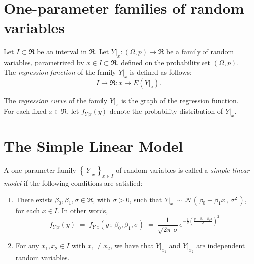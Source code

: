 \documentclass{article}
\begin{document}


\pagestyle{fancy}

%

\lfoot[]{}
\cfoot[]{}
\rfoot[]{\thepage}


\section{One-parameter families of random variables}
\setcounter{theorem}{0}

Let $I \subset \Re$ be an interval in $\Re$.
Let $Y|_{x} : (\Omega,p) \longrightarrow \Re$ be a family of random variables, parametrized by $x\in I \subset \Re$, defined on the probability set $(\Omega,p)$.  \\

\noindent
The \emph{regression function} of the family $Y|_{x}$ is defined as follows:
\begin{equation*}
    I \longrightarrow \Re : x \longmapsto E(Y|_{x}).
\end{equation*}

\noindent
The \emph{regression curve} of the family $Y|_{x}$ is the graph of the regression function. \\

\noindent
For each fixed $x\in\Re$, let $f_{Y|x}(y)$ denote the probability distribution of $Y|_{x}$.


\section{The Simple Linear Model}
\setcounter{theorem}{0}

A one-parameter family $\left\{\,Y|_{x}\,\right\}_{x\in I}$ of random variables is called a \emph{simple linear model} if the following conditions are satisfied:
\begin{enumerate}
\item  There exists $\beta_{0},\beta_{1},\sigma\in\Re$, with $\sigma > 0$, such that
          $Y|_{x} \, \sim \, \mathcal{N}(\,\beta_{0}+\beta_{1}x\,,\,\sigma^{2}\,)$, for each $x \in I$.
          In other words,
          \begin{equation*}
              f_{Y|x}(y) \; = \; f_{Y|x}(y\,;\,\beta_{0},\beta_{1},\sigma) \; = \; \dfrac{1}{\sqrt{2\pi}\,\sigma}\,e^{-\frac{1}{2}\left(\frac{y-\beta_{0}-\beta_{1}x}{\sigma}\right)^{2}}
          \end{equation*}
\item  For any $x_{1},x_{2}\in I$ with $x_{1}\neq x_{2}$, we have that $Y|_{x_{1}}$ and $Y|_{x_{2}}$
          are independent random variables. 
\end{enumerate}
\end{document}
